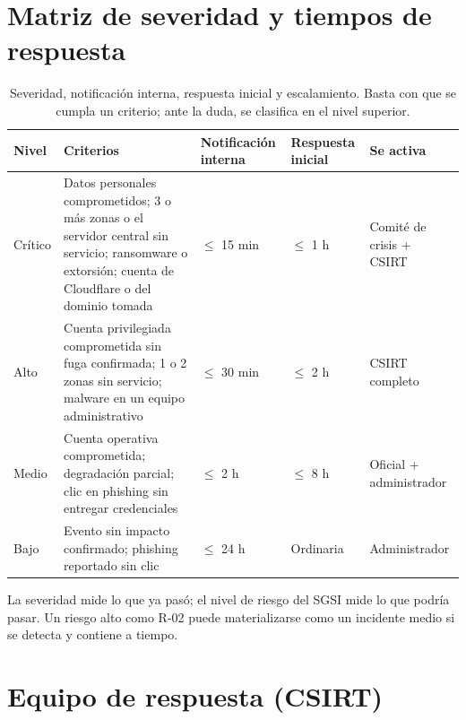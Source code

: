 \section{Matriz de severidad y tiempos de respuesta}

\begin{table}[H]
\centering
\caption{Severidad, notificación interna, respuesta inicial y escalamiento. Basta con que se cumpla un criterio; ante la duda, se clasifica en el nivel superior.}
\label{tab:anx-inc-severidad}
\small
\begin{tabularx}{\textwidth}{L{1.5cm}XL{1.6cm}L{1.6cm}L{2.6cm}}
\toprule
\textbf{Nivel} & \textbf{Criterios} & \textbf{Notificación interna} & \textbf{Respuesta inicial} & \textbf{Se activa} \\
\midrule
Crítico & Datos personales comprometidos; 3 o más zonas o el servidor central sin servicio; ransomware o extorsión; cuenta de Cloudflare o del dominio tomada & $\leq$ 15 min & $\leq$ 1 h & Comité de crisis + CSIRT \\
Alto & Cuenta privilegiada comprometida sin fuga confirmada; 1 o 2 zonas sin servicio; malware en un equipo administrativo & $\leq$ 30 min & $\leq$ 2 h & CSIRT completo \\
Medio & Cuenta operativa comprometida; degradación parcial; clic en phishing sin entregar credenciales & $\leq$ 2 h & $\leq$ 8 h & Oficial + administrador \\
Bajo & Evento sin impacto confirmado; phishing reportado sin clic & $\leq$ 24 h & Ordinaria & Administrador \\
\bottomrule
\end{tabularx}
\end{table}

\noindent La severidad mide lo que ya pasó; el nivel de riesgo del SGSI mide lo que podría
pasar. Un riesgo alto como R-02 puede materializarse como un incidente medio si se detecta y
contiene a tiempo.

\section{Equipo de respuesta (CSIRT)}

